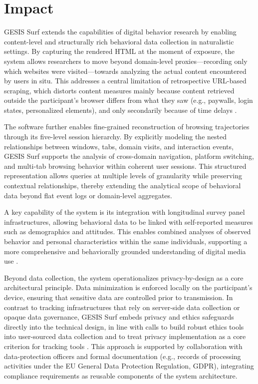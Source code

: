 \documentclass[preprint,12pt,a4paper]{elsarticle}
\begin{document}
  \section{Impact}

GESIS Surf extends the capabilities of digital behavior research by enabling content-level and structurally rich behavioral data collection in naturalistic settings. By capturing the rendered HTML at the moment of exposure, the system allows researchers to move beyond domain-level proxies---recording only which websites were visited---towards analyzing the actual content encountered by users in situ. This addresses a central limitation of retrospective URL-based scraping, which distorts content measures mainly because content retrieved outside the participant's browser differs from what they saw (e.g., paywalls, login states, personalized elements), and only secondarily because of time delays \cite{ulloa2025scraping}.

The software further enables fine-grained reconstruction of browsing trajectories through its five-level session hierarchy. By explicitly modeling the nested relationships between windows, tabs, domain visits, and interaction events, GESIS Surf supports the analysis of cross-domain navigation, platform switching, and multi-tab browsing behavior within coherent user sessions. This structured representation allows queries at multiple levels of granularity while preserving contextual relationships, thereby extending the analytical scope of behavioral data beyond flat event logs or domain-level aggregates.

A key capability of the system is its integration with longitudinal survey panel infrastructures, allowing behavioral data to be linked with self-reported measures such as demographics and attitudes. This enables combined analyses of observed behavior and personal characteristics within the same individuals, supporting a more comprehensive and behaviorally grounded understanding of digital media use \cite{stier2020integrating}.

Beyond data collection, the system operationalizes privacy-by-design as a core architectural principle. Data minimization is enforced locally on the participant's device, ensuring that sensitive data are controlled prior to transmission. In contrast to tracking infrastructures that rely on server-side data collection or opaque data governance, GESIS Surf embeds privacy and ethics safeguards directly into the technical design, in line with calls to build robust ethics tools into user-sourced data collection \cite{meyer2023ethics} and to treat privacy implementation as a core criterion for tracking tools \cite{Christner2022}. This approach is supported by collaboration with data-protection officers and formal documentation (e.g., records of processing activities under the EU General Data Protection Regulation, GDPR), integrating compliance requirements as reusable components of the system architecture.
\end{document}
